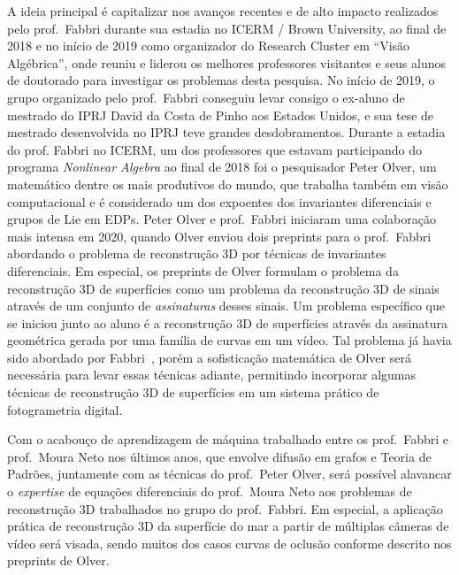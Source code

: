 \documentclass[a4paper,titlepage]{article}
\begin{document}
A ideia principal é capitalizar nos avanços recentes e de alto impacto
realizados pelo prof.\ Fabbri durante sua estadia no ICERM / Brown University,
ao final de 2018 e no início de 2019 como organizador do Research Cluster em
``Visão Algébrica'', onde reuniu e liderou os melhores professores visitantes e seus alunos
de doutorado para investigar os problemas desta pesquisa. No início de 2019, o
grupo organizado pelo prof.\ Fabbri conseguiu levar consigo o ex-aluno de
mestrado do IPRJ David da Costa de Pinho aos Estados Unidos, e sua tese de mestrado desenvolvida no
IPRJ teve grandes desdobramentos. Durante a estadia do prof. Fabbri no ICERM,
um dos professores que estavam participando do programa \emph{Nonlinear
Algebra} ao final de 2018 foi o pesquisador Peter Olver, um matemático dentre os
mais produtivos do mundo, que trabalha também em visão computacional e é
considerado um dos expoentes dos invariantes diferenciais e grupos de Lie em
EDPs. Peter Olver e prof.\ Fabbri iniciaram uma colaboração mais intensa em 2020, quando Olver enviou
dois preprints para o prof.\ Fabbri abordando o problema de reconstrução 3D
por técnicas de invariantes diferenciais. Em especial, os preprints de Olver
formulam o problema da reconstrução 3D de superfícies como um problema da
reconstrução 3D de sinais através de um conjunto de \emph{assinaturas} desses
sinais. Um problema específico que se iniciou junto ao aluno é a
reconstrução 3D de superfícies através da assinatura geométrica gerada por uma
família de curvas em um vídeo. Tal problema já havia sido abordado por
Fabbri~\cite{Fabbri:Kimia:IJCV2016}, porém a sofisticação matemática de Olver
será necessária para levar essas técnicas adiante, permitindo
incorporar algumas técnicas de reconstrução 3D de superfícies em um sistema
prático de fotogrametria digital.

Com o acabouço de aprendizagem de máquina trabalhado entre os prof.\ Fabbri e
prof.\ Moura Neto nos últimos anos, que envolve difusão em grafos e Teoria de
Padrões, juntamente com as técnicas do prof.\ Peter Olver, será possível
alavancar o \emph{expertise} de equações diferenciais do prof.\ Moura Neto aos problemas de
reconstrução 3D trabalhados no grupo do prof.\ Fabbri. Em especial, a aplicação
prática de reconstrução 3D da superfície do mar a partir de múltiplas câmeras de
vídeo será visada, sendo muitos dos casos curvas de oclusão conforme descrito
nos preprints de Olver.
\end{document}
